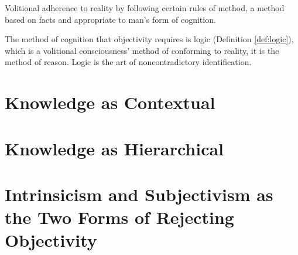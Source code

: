             \begin{definition}[Obectivity]
            \label{def:objectivity}
                Volitional adherence to reality by following certain rules of method, a method based on facts and appropriate to man's form of cognition.
            \end{definition}

        The method of cognition that objectivity requires is logic (Definition \ref{def:logic}), which is a volitional consciousness' method of conforming to reality, it is the method of reason. Logic is the art of noncontradictory identification.

    \section{Knowledge as Contextual}

    \section{Knowledge as Hierarchical}

    \section{Intrinsicism and Subjectivism as the Two Forms of Rejecting Objectivity}




